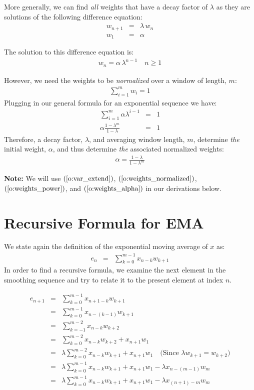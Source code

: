 \documentclass{article}
\begin{document}
More generally, we can find {\em all\/} weights that have a decay factor of $\lambda$ as they
are solutions of the following difference equation:
\begin{eqnarray}
	w_{n+1} & = & \lambda \, w_n \\
	w_1 & = & \alpha
\end{eqnarray}

The solution to this difference equation is:
\begin{eqnarray}
	w_n = \alpha \, \lambda^{n-1} \quad n \ge 1
\end{eqnarray}

However, we need the weights to be {\em normalized\/} over a window of length, $m$:
\begin{eqnarray}
\sum_{i=1}^m w_i = 1
\end{eqnarray}
Plugging in our general formula for an exponential sequence we have:
\begin{eqnarray}
	\sum_{i=1}^m \alpha \lambda^{i-1} & = & 1 \\
	\alpha \frac{1 - \lambda^m}{1 - \lambda} & = & 1	
\end{eqnarray}
Therefore, a decay factor, $\lambda$, and averaging window length, $m$, 
determine {\em the\/} initial weight, $\alpha$, and thus determine {\em the\/}
associated normalized weights:
\begin{eqnarray}
	\alpha = \frac{1 - \lambda}{1 - \lambda^m} \label{o:weights_alpha}
\end{eqnarray}

{\bf Note:\/} We will use $(\ref{o:var_extend})$, $(\ref{o:weights_normalized})$,
$(\ref{o:weights_power})$, and $(\ref{o:weights_alpha})$ in our derivations below.

\section{Recursive Formula for EMA}
We state again the definition of the exponential moving average of $x$ as:
\begin{eqnarray}
    e_n &=& \sum_{k=0}^{m-1} x_{n-k} w_{k+1} 
\end{eqnarray}
In order to find a recursive formula, we examine the next element in the smoothing sequence 
and try to relate it to the present element at index $n$.

\begin{eqnarray*}
    e_{n+1} &=&  \sum_{k=0}^{m-1} x_{n+1-k} w_{k+1} \\
        &=&  \sum_{k=0}^{m-1} x_{n-(k-1)} w_{k+1} \\
        &=&  \sum_{k=-1}^{m-2} x_{n-k} w_{k+2}  \\
        &=&  \sum_{k=0}^{m-2} x_{n-k} w_{k+2}  + x_{n+1} w_1 \\
        &=&  \lambda \sum_{k=0}^{m-2} x_{n-k} w_{k+1}  + x_{n+1} w_1  \quad \text{(Since $\lambda w_{k+1} = w_{k+2}$)} \\
        &=&  \lambda \sum_{k=0}^{m-1} x_{n-k} w_{k+1}  + x_{n+1} w_1  
                - \lambda x_{n-(m-1)} w_m  \\
        &=&  \lambda \sum_{k=0}^{m-1} x_{n-k} w_{k+1}  + x_{n+1} w_1  
                - \lambda x_{(n+1)-m} w_m  
\end{eqnarray*}
\end{document}
